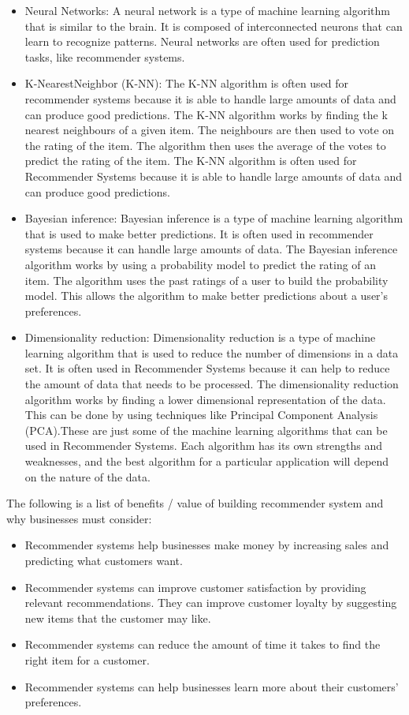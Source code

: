 \documentclass[11pt]{article}
\begin{document}
\begin{itemize}
\item Neural Networks: A neural network is a type of machine learning algorithm that is similar to the brain. It is composed of interconnected neurons that can learn to recognize patterns. Neural networks are often used for prediction tasks, like recommender systems.
\item K-NearestNeighbor (K-NN): The K-NN algorithm is often used for recommender systems because it is able to handle large amounts of data and can produce good predictions. The K-NN algorithm works by finding the k nearest neighbours of a given item. The neighbours are then used to vote on the rating of the item. The algorithm then uses the average of the votes to predict the rating of the item. The K-NN algorithm is often used for Recommender Systems because it is able to handle large amounts of data and can produce good predictions.
\item Bayesian inference: Bayesian inference is a type of machine learning algorithm that is used to make better predictions. It is often used in recommender systems because it can handle large amounts of data. The Bayesian inference algorithm works by using a probability model to predict the rating of an item. The algorithm uses the past ratings of a user to build the probability model. This allows the algorithm to make better predictions about a user’s preferences.
\item Dimensionality reduction: Dimensionality reduction is a type of machine learning algorithm that is used to reduce the number of dimensions in a data set. It is often used in Recommender Systems because it can help to reduce the amount of data that needs to be processed. The dimensionality reduction algorithm works by finding a lower dimensional representation of the data. This can be done by using techniques like Principal Component Analysis (PCA).These are just some of the machine learning algorithms that can be used in Recommender Systems. Each algorithm has its own strengths and weaknesses, and the best algorithm for a particular application will depend on the nature of the data.
\end{itemize}


The following is a list of benefits / value of building recommender system and why businesses must consider:

\begin{itemize}
\item Recommender systems help businesses make money by increasing sales and predicting what customers want.
\item Recommender systems can improve customer satisfaction by providing relevant recommendations. They can improve customer loyalty by suggesting new items that the customer may like.
\item Recommender systems can reduce the amount of time it takes to find the right item for a customer.
\item Recommender systems can help businesses learn more about their customers’ preferences.
\end{itemize}
\end{document}
